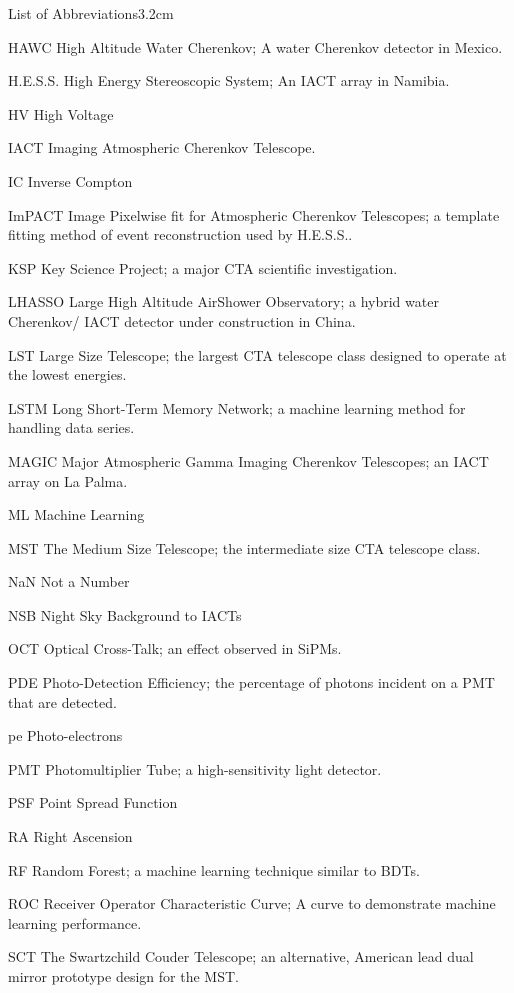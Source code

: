 \begin{mclistof}{List of Abbreviations}{3.2cm}
\item[HAWC] High Altitude Water Cherenkov; A water Cherenkov detector in Mexico.
\item[H.E.S.S.] High Energy Stereoscopic System; An IACT array in Namibia.
\item[HV] High Voltage
\item[IACT] Imaging Atmospheric Cherenkov Telescope.
\item[IC] Inverse Compton
\item[ImPACT] Image Pixelwise fit for Atmospheric Cherenkov Telescopes; a template fitting method of event reconstruction used by H.E.S.S..
\item[KSP] Key Science Project; a major CTA scientific investigation.
\item[LHASSO] Large High Altitude AirShower Observatory; a hybrid water Cherenkov/ IACT detector under construction in China.
\item[LST] Large Size Telescope; the largest CTA telescope class designed to operate at the lowest energies.
\item[LSTM] Long Short-Term Memory Network; a machine learning method for handling data series.
\item[MAGIC] Major Atmospheric Gamma Imaging Cherenkov Telescopes; an IACT array on La Palma.
\item[ML] Machine Learning
\item[MST] The Medium Size Telescope; the intermediate size CTA telescope class.
\item[NaN] Not a Number
\item[NSB] Night Sky Background to IACTs
\item[OCT] Optical Cross-Talk; an effect observed in SiPMs.
\item[PDE] Photo-Detection Efficiency; the percentage of photons incident on a PMT that are detected.
\item[pe] Photo-electrons
\item[PMT] Photomultiplier Tube; a high-sensitivity light detector.
\item[PSF] Point Spread Function
\item[RA] Right Ascension
\item[RF] Random Forest; a machine learning technique similar to BDTs.
\item[ROC] Receiver Operator Characteristic Curve; A curve to demonstrate machine learning performance. 
\item[SCT] The Swartzchild Couder Telescope; an alternative, American lead dual mirror prototype design for the MST.

\end{mclistof}
